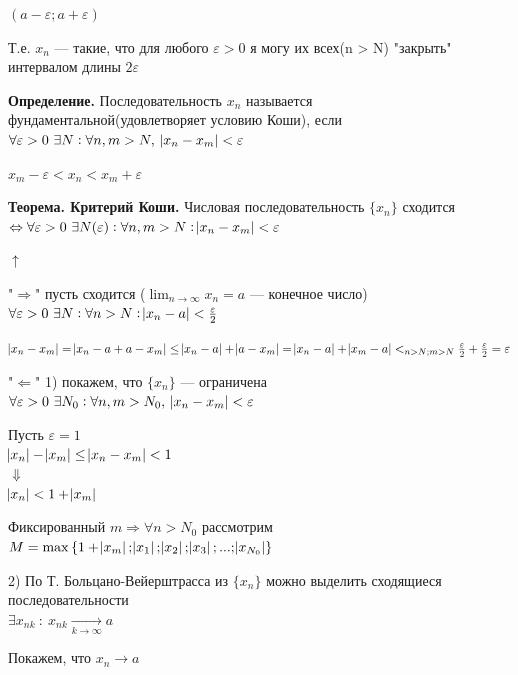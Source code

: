 \documentclass{article}
\begin{document}
    \( (a - \varepsilon; a + \varepsilon) \)

    Т.е. \( x_n \) --- такие, что для любого \( \varepsilon > 0 \) я могу их всех(n > N) "закрыть" интервалом длины \(2\varepsilon\)

    \textbf{Определение.} Последовательность \( x_n \) называется фундаментальной(удовлетворяет условию Коши), если \( \forall \varepsilon > 0\ \exists N: \forall n, m > N,\ \abs{x_n - x_m} < \varepsilon \)
    
    \(x_m - \varepsilon < x_n < x_m + \varepsilon\)

    \textbf{Теорема. Критерий Коши.} Числовая последовательность \( \{x_n\} \) сходится \( \Leftrightarrow \forall \varepsilon > 0\ \exists N(\varepsilon): \forall n, m > N: \abs{x_n - x_m} < \varepsilon \) 

    \(\uparrow\)
    
    "\(\Rightarrow\)" пусть сходится (\(\lim_{n \rightarrow \infty}{x_n} = a\) --- конечное число) \(\forall \varepsilon > 0\ \exists N : \forall n > N: \abs{x_n - a} < \frac{\varepsilon}{2} \)

    \( \abs{x_n - x_m} = \abs{x_n - a + a - x_m} \leq \abs{x_n - a} + \abs{a - x_m} = \abs{x_n - a} + \abs{x_m - a} <_{n > N; m > N} \frac{\varepsilon}{2} + \frac{\varepsilon}{2} = \varepsilon \)

    "\(\Leftarrow\)" 1) покажем, что \(\{x_n\}\) --- ограничена \(\forall \varepsilon > 0\ \exists N_0 : \forall n,m > N_0,\ \abs{x_n - x_m} < \varepsilon\)
    
    Пусть \(\varepsilon = 1\)
    \\\(\abs{x_n} - \abs{x_m} \leq \abs{x_n - x_m} < 1\)
    \\\( \Downarrow \)
    \\\( \abs{x_n} < 1 + \abs{x_m} \)

    Фиксированный \( m \Rightarrow \forall n > N_0 \) рассмотрим \( M = \max{\{ 1 + \abs{x_m}; \abs{x_1}; \abs{x_2}; \abs{x_3}; ... ; \abs{x_{N_0}} \}} \)
    
    2) По Т. Больцано-Вейерштрасса из \(\{x_n\}\) можно выделить сходящиеся последовательности
    \\\(\exists x_{nk}\ :\ x_{nk} \xrightarrow[k \rightarrow \infty]{} a \)

    Покажем, что \( x_n \rightarrow a \)
\end{document}
